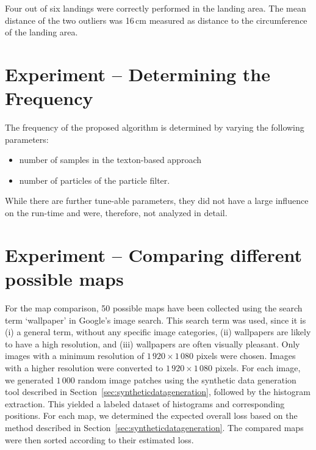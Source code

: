\documentclass[11pt]{report}
\begin{document}
Four out of six landings were correctly performed in the landing
area. The mean distance of the two outliers was 16\,cm measured as
distance to the circumference of the landing area.
%

\section{Experiment -- Determining the Frequency}

The frequency of the proposed algorithm is determined by varying the
following parameters:
\begin{itemize}
\item number of samples in the texton-based approach
\item number of particles of the particle filter.
\end{itemize}

While there are further tune-able parameters, they did not have a
large influence on the run-time and were, therefore, not analyzed in
detail.

\section{Experiment -- Comparing different possible maps}

For the map comparison, 50 possible maps have been collected using the
search term `wallpaper' in Google's image search. This search term was
used, since it is (i) a general term, without any specific image
categories, (ii) wallpapers are likely to have a high resolution, and
(iii) wallpapers are often visually pleasant. Only images with a
minimum resolution of $1\,920 \times 1\,080$ pixels were
chosen. Images with a higher resolution were converted to
$1\,920 \times 1\,080$ pixels. For each image, we generated $1\,000$
random image patches using the synthetic data generation tool
described in Section~\ref{sec:syntheticdatageneration}, followed by
the histogram extraction. This yielded a labeled dataset of histograms
and corresponding positions. For each map, we determined the expected
overall loss based on the method described in
Section~\ref{sec:syntheticdatageneration}. The compared maps were then
sorted according to their estimated loss.
\end{document}
